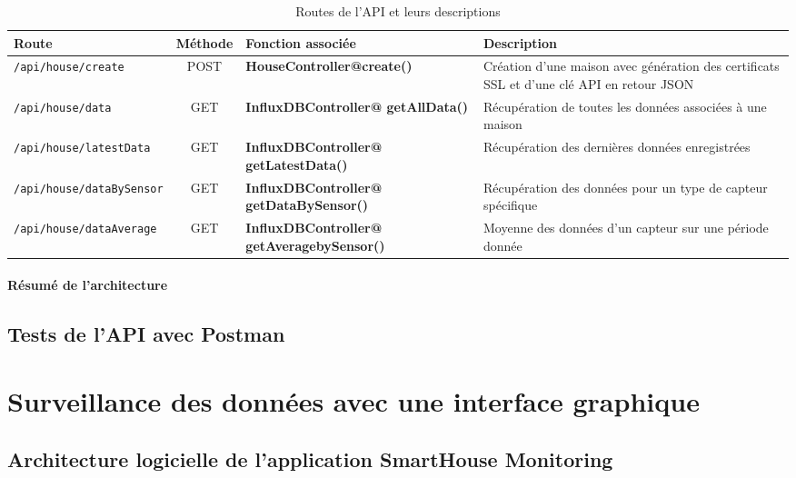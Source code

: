 \documentclass[10pt, a4paper]{report}
\begin{document}
	

\begin{table}[h]
	\centering
	\small %
	\renewcommand{\arraystretch}{1.2} %
	\begin{tabularx}{\textwidth}{|X|c|X|X|}
		\hline
		\textbf{Route} & \textbf{Méthode} & \textbf{Fonction associée} & \textbf{Description} \\
		\hline
		\texttt{/api/house/create} & POST & \textbf{HouseController@create()} & Création d’une maison avec génération des certificats SSL et d’une clé API en retour JSON \\
		\hline
		\texttt{/api/house/data} & GET & \textbf{InfluxDBController@
		getAllData()} & Récupération de toutes les données associées à une maison \\
		\hline
		\texttt{/api/house/latestData} & GET & \textbf{InfluxDBController@
			getLatestData()} & Récupération des dernières données enregistrées \\
		\hline
		\texttt{/api/house/dataBySensor} & GET & \textbf{InfluxDBController@
			getDataBySensor()} & Récupération des données pour un type de capteur spécifique \\
		\hline
		\texttt{/api/house/dataAverage} & GET & \textbf{InfluxDBController@
			getAveragebySensor()} & Moyenne des données d’un capteur sur une période donnée \\
		\hline
	\end{tabularx}
	\caption{Routes de l'API et leurs descriptions}
	\label{tab:api_routes}
\end{table}

	\paragraph{Résumé de l'architecture}
	
	
	\subsection{Tests de l'API avec Postman}
	
	\section{Surveillance des données avec une interface graphique}
	\subsection{Architecture logicielle de l'application SmartHouse Monitoring}
\end{document}

